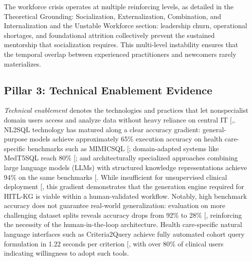 \documentclass[
  american,
  11pt,
  letterpaper,
  oneside  ,captions=tableheading
]{scrartcl}
\begin{document}
The workforce crisis operates at multiple reinforcing levels, as
detailed in the Theoretical Grounding: Socialization, Externalization,
Combination, and Internalization and the Unstable Workforce section:
leadership churn, operational shortages, and foundational attrition
collectively prevent the sustained mentorship that socialization
requires. This multi-level instability ensures that the temporal overlap
between experienced practitioners and newcomers rarely materializes.

\subsection{Pillar 3: Technical Enablement
Evidence}\label{pillar-3-technical-enablement-evidence}

\emph{Technical enablement} denotes the technologies and practices that
let nonspecialist domain users access and analyze data without heavy
reliance on central IT
{[},\citeproc{ref-banihani2020}{55}{]}.
NL2SQL technology has matured along a clear accuracy gradient:
general-purpose models achieve approximately 65\% execution accuracy on
health care-specific benchmarks such as MIMICSQL
{[}\citeproc{ref-blaskovic2025}{56}{]}; domain-adapted systems like
MedT5SQL reach 80\% {[}\citeproc{ref-marshan2024}{57}{]}; and
architecturally specialized approaches combining large language models
(LLMs) with structured knowledge representations achieve 94\% on the
same benchmarks {[}\citeproc{ref-chen2026graph}{58}{]}. While
insufficient for unsupervised clinical deployment
{[}\citeproc{ref-ziletti2024}{38}{]}, this gradient demonstrates that
the generation engine required for HITL-KG is viable within a
human-validated workflow. Notably, high benchmark accuracy does not
guarantee real-world generalization: evaluation on more challenging
dataset splits reveals accuracy drops from 92\% to 28\%
{[}\citeproc{ref-tarbell2024}{59}{]}, reinforcing the necessity of the
human-in-the-loop architecture. Health care-specific natural language
interfaces such as Criteria2Query achieve fully automated cohort query
formulation in 1.22 seconds per criterion
{[}\citeproc{ref-yuan2019}{60}{]}, with over 80\% of clinical users
indicating willingness to adopt such tools.
\end{document}
